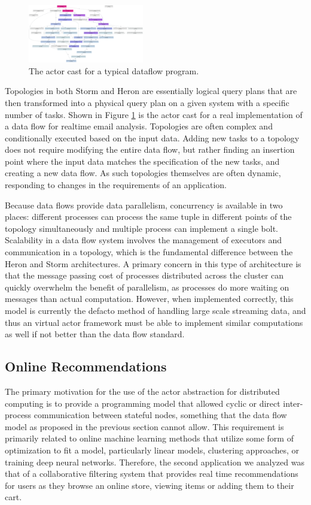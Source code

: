 \documentclass[conference,twocolumn,10pt]{IEEEtran}
\begin{document}
\begin{figure}[!h]
    \centering
    \includegraphics[width=0.45\textwidth]{dataflow_cast}
    \caption{The actor cast for a typical dataflow program.}
    \label{fig:dataflow_cast}
\end{figure}

Topologies in both Storm and Heron are essentially logical query plans that are then transformed into a physical query plan on a given system with a specific number of tasks. Shown in Figure \ref{fig:dataflow_cast} is the actor cast for a real implementation of a data flow for realtime email analysis. Topologies are often complex and conditionally executed based on the input data. Adding new tasks to a topology does not require modifying the entire data flow, but rather finding an insertion point where the input data matches the specification of the new tasks, and creating a new data flow. As such topologies themselves are often dynamic, responding to changes in the requirements of an application.

Because data flows provide data parallelism, concurrency is available in two places: different processes can process the same tuple in different points of the topology simultaneously and multiple process can implement a single bolt. Scalability in a data flow system involves the management of executors and communication in a topology, which is the fundamental difference between the Heron and Storm architectures. A primary concern in this type of architecture is that the message passing cost of processes distributed across the cluster can quickly overwhelm the benefit of parallelism, as processes do more waiting on messages than actual computation. However, when implemented correctly, this model is currently the defacto method of handling large scale streaming data, and thus an virtual actor framework must be able to implement similar computations as well if not better than the data flow standard.

\subsection{Online Recommendations}

The primary motivation for the use of the actor abstraction for distributed computing is to provide a programming model that allowed cyclic or direct inter-process communication between stateful nodes, something that the data flow model as proposed in the previous section cannot allow. This requirement is primarily related to online machine learning methods that utilize some form of optimization to fit a model, particularly linear models, clustering approaches, or training deep neural networks. Therefore, the second application we analyzed was that of a collaborative filtering system that provides real time recommendations for users as they browse an online store, viewing items or adding them to their cart.
\end{document}
